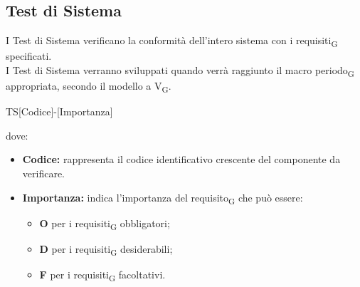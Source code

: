 \pagebreak
\subsection{Test di Sistema}
I Test di Sistema verificano la conformità dell'intero sistema con i requisiti\textsubscript{G} specificati.\\I Test di Sistema verranno sviluppati quando verrà raggiunto il macro periodo\textsubscript{G} appropriata, secondo il modello a V\textsubscript{G}.
\begin{center}
	TS[Codice]-[Importanza]\\
\end{center}
dove:
\begin{itemize}
	\item \textbf{Codice:} rappresenta il codice identificativo crescente del componente da verificare.
	\item \textbf{Importanza:} indica l'importanza del requisito\textsubscript{G} che può essere:
	\begin{itemize}
		\item \textbf{O} per i requisiti\textsubscript{G} obbligatori;
		\item \textbf{D} per i requisiti\textsubscript{G} desiderabili;
		\item \textbf{F} per i requisiti\textsubscript{G} facoltativi.
	\end{itemize}
\end{itemize}


